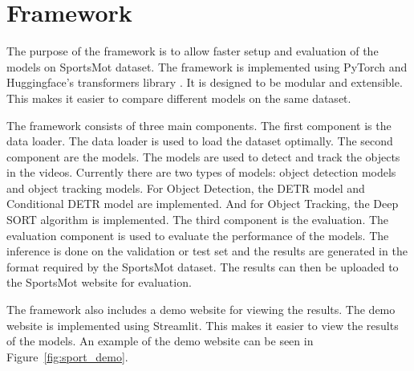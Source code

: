 \documentclass[runningheads]{llncs}
\begin{document}

\section{Framework}
The purpose of the framework is to allow faster setup and evaluation of the models on SportsMot dataset.
The framework is implemented using PyTorch \cite{pytorch2019} and Huggingface's transformers library \cite{wolf-etal-2020-transformers}.
It is designed to be modular and extensible.
This makes it easier to compare different models on the same dataset.

The framework consists of three main components.
The first component is the data loader.
The data loader is used to load the dataset optimally.
The second component are the models.
The models are used to detect and track the objects in the videos.
Currently there are two types of models: object detection models and object tracking models.
For Object Detection, the DETR model \cite{detr2020} and Conditional DETR model \cite{conditionaldetr2021} are implemented.
And for Object Tracking, the Deep SORT algorithm \cite{DBLP:journals/corr/abs-1907-03465} is implemented.
The third component is the evaluation.
The evaluation component is used to evaluate the performance of the models.
The inference is done on the validation or test set and the results are generated in the format required by the SportsMot dataset.
The results can then be uploaded to the SportsMot website for evaluation.

The framework also includes a demo website for viewing the results.
The demo website is implemented using Streamlit.
This makes it easier to view the results of the models.
An example of the demo website can be seen in Figure~\ref{fig:sport_demo}.
\end{document}
